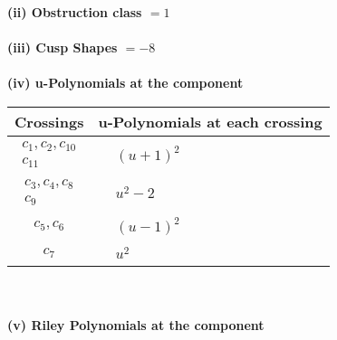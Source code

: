 \documentclass[1p]{elsarticle_modified}
\theoremstyle{definition}
\begin{document}
\flushleft \textbf{(ii) Obstruction class $= 1$}\\~\\
\flushleft \textbf{(iii) Cusp Shapes $= -8$}\\~\\
\newpage\renewcommand{\arraystretch}{1}
\flushleft \textbf{(iv) u-Polynomials at the component}\newline \\
\begin{tabular}{m{50pt}|m{274pt}}
Crossings & \hspace{64pt}u-Polynomials at each crossing \\
\hline $$\begin{aligned}c_{1},c_{2},c_{10}\\c_{11}\end{aligned}$$&$\begin{aligned}
&(u+1)^2
\end{aligned}$\\
\hline $$\begin{aligned}c_{3},c_{4},c_{8}\\c_{9}\end{aligned}$$&$\begin{aligned}
&u^2-2
\end{aligned}$\\
\hline $$\begin{aligned}c_{5},c_{6}\end{aligned}$$&$\begin{aligned}
&(u-1)^2
\end{aligned}$\\
\hline $$\begin{aligned}c_{7}\end{aligned}$$&$\begin{aligned}
&u^2
\end{aligned}$\\
\hline
\end{tabular}\\~\\
\newpage\renewcommand{\arraystretch}{1}
\flushleft \textbf{(v) Riley Polynomials at the component}\newline \\
\end{document}
